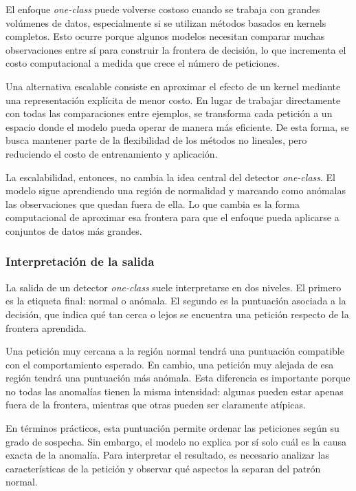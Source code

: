 \documentclass[12pt,oneside]{report}
\begin{document}
El enfoque \textit{one-class} puede volverse costoso cuando se trabaja con grandes volúmenes de datos, especialmente si se utilizan métodos basados en kernels completos. Esto ocurre porque algunos modelos necesitan comparar muchas observaciones entre sí para construir la frontera de decisión, lo que incrementa el costo computacional a medida que crece el número de peticiones.

Una alternativa escalable consiste en aproximar el efecto de un kernel mediante una representación explícita de menor costo. En lugar de trabajar directamente con todas las comparaciones entre ejemplos, se transforma cada petición a un espacio donde el modelo pueda operar de manera más eficiente. De esta forma, se busca mantener parte de la flexibilidad de los métodos no lineales, pero reduciendo el costo de entrenamiento y aplicación.

La escalabilidad, entonces, no cambia la idea central del detector \textit{one-class}. El modelo sigue aprendiendo una región de normalidad y marcando como anómalas las observaciones que quedan fuera de ella. Lo que cambia es la forma computacional de aproximar esa frontera para que el enfoque pueda aplicarse a conjuntos de datos más grandes.

\subsubsection{Interpretación de la salida}

La salida de un detector \textit{one-class} suele interpretarse en dos niveles. El primero es la etiqueta final: normal o anómala. El segundo es la puntuación asociada a la decisión, que indica qué tan cerca o lejos se encuentra una petición respecto de la frontera aprendida.

Una petición muy cercana a la región normal tendrá una puntuación compatible con el comportamiento esperado. En cambio, una petición muy alejada de esa región tendrá una puntuación más anómala. Esta diferencia es importante porque no todas las anomalías tienen la misma intensidad: algunas pueden estar apenas fuera de la frontera, mientras que otras pueden ser claramente atípicas.

En términos prácticos, esta puntuación permite ordenar las peticiones según su grado de sospecha. Sin embargo, el modelo no explica por sí solo cuál es la causa exacta de la anomalía. Para interpretar el resultado, es necesario analizar las características de la petición y observar qué aspectos la separan del patrón normal.
\end{document}

